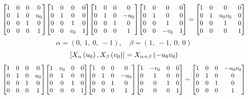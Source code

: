 \documentclass[11pt]{article}
\theoremstyle{definition}
\begin{document}
\[
\scaletoalign{\textwidth}{{\left[\begin{matrix}1 & 0 & 0 & 0\\0 & 1 & 0 & u_{0}\\0 & 0 & 1 & 0\\0 & 0 & 0 & 1\end{matrix}\right]} {\left[\begin{matrix}1 & 0 & 0 & 0\\0 & 1 & 0 & 0\\0 & 0 & 1 & 0\\0 & 0 & v_{0} & 1\end{matrix}\right]} {\left[\begin{matrix}1 & 0 & 0 & 0\\0 & 1 & 0 & - u_{0}\\0 & 0 & 1 & 0\\0 & 0 & 0 & 1\end{matrix}\right]} {\left[\begin{matrix}1 & 0 & 0 & 0\\0 & 1 & 0 & 0\\0 & 0 & 1 & 0\\0 & 0 & - v_{0} & 1\end{matrix}\right]} = {\left[\begin{matrix}1 & 0 & 0 & 0\\0 & 1 & u_{0} v_{0} & 0\\0 & 0 & 1 & 0\\0 & 0 & 0 & 1\end{matrix}\right]}}
\]
\[
\alpha = \left( 0, \  1, \  0, \  -1\right), \quad \beta = \left( 1, \  -1, \  0, \  0\right)
\]
\[
\scaletoalign{\textwidth}{\left[ X_{\alpha}\left(u_{0}\right), X_{\beta}\left(v_{0}\right) \right] = X_{\alpha + \beta}\left(- u_{0} v_{0}\right)}
\]
\[
\scaletoalign{\textwidth}{{\left[\begin{matrix}1 & 0 & 0 & 0\\0 & 1 & 0 & u_{0}\\0 & 0 & 1 & 0\\0 & 0 & 0 & 1\end{matrix}\right]} {\left[\begin{matrix}1 & v_{0} & 0 & 0\\0 & 1 & 0 & 0\\0 & 0 & 1 & 0\\0 & 0 & 0 & 1\end{matrix}\right]} {\left[\begin{matrix}1 & 0 & 0 & 0\\0 & 1 & 0 & - u_{0}\\0 & 0 & 1 & 0\\0 & 0 & 0 & 1\end{matrix}\right]} {\left[\begin{matrix}1 & - v_{0} & 0 & 0\\0 & 1 & 0 & 0\\0 & 0 & 1 & 0\\0 & 0 & 0 & 1\end{matrix}\right]} = {\left[\begin{matrix}1 & 0 & 0 & - u_{0} v_{0}\\0 & 1 & 0 & 0\\0 & 0 & 1 & 0\\0 & 0 & 0 & 1\end{matrix}\right]}}
\]
\end{document}
